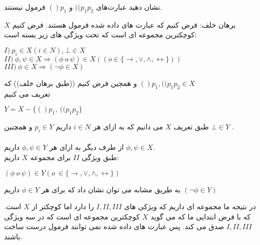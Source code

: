 نشان دهید عبارت‌های $((p_1p_2$ و $()p_1$ فرمول نیستند.


\begin{ans}
    برهان خلف: فرض کنیم که عبارت های داده شده فرمول هستند. فرض کنیم 
    $X$
    کوچکترین مجموعه ای است که تحت ویژگی های زیر بسته است:
    \begin{flushleft}
        $I) \ p_i \in X(i \in N), \bot \in X$
        \\
        $II) \ \phi,\psi \in X \Rightarrow (\phi \ o \ \psi) \in X ((o \in \{\rightarrow, \vee, \wedge, \leftrightarrow \}))$
        \\
        $III) \ \phi \in X \Rightarrow (\neg \phi \in X)$
        
    \end{flushleft}
    و همچین فرض کنیم ((طبق برهان خلف)) که 
    $()p_1, ((p_1p_2 \in X$
    \\
    تعریف می کنیم 
    \begin{flushleft}
        $Y = X - \{()p_1, \ ((p_1p_2\}$
    \end{flushleft}

    طبق تعریف 
    $X$
    می دانیم که به ازای هر 
    $i \in N$
    داریم 
    $p_i \in Y$
    و همچنین
    $\bot \in Y$
    .
    \\
    \\
    از طرف دیگر به ازای هر 
    $\phi,\psi \in Y$
    داریم 
    $\phi, \psi \in X$.
    \\
    طبق ویژگی 
    $II$
    برای مجموعه 
    $X$
    داریم:
    \begin{flushleft}
        $(\phi \ o \ \psi) \in Y (o \ \in \{\rightarrow, \vee, \wedge, \leftrightarrow\})$
    \end{flushleft}

    به طریق مشابه می توان نشان داد که برای هر 
    $\phi \in Y$
    داریم 
    $(\neg\phi\in Y)$

    در نتیجه ما مجموعه ای داریم که ویژکی های 
    $I,II, III$
    را دارد اما کوچکتر از 
    $X$
    است. که با فرض ابتدایی ما که می گوید
    $X$
    کوچکترین مجموعه ای است که در سه ویژگی 
    $I,II,III$
    صدق می کند. 
    پس عبارت های داده شده نمی توانند فرمول درست ساخت باشند.
\end{ans}
